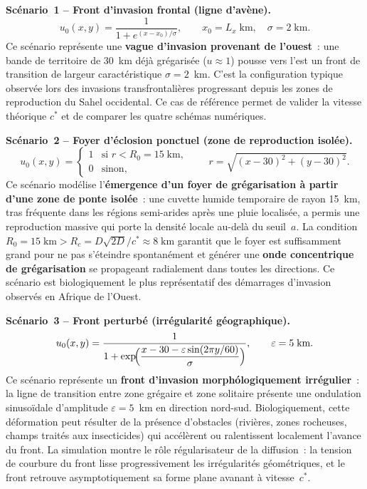 \documentclass[11pt,a4paper]{report}
\begin{document}
\medskip
\noindent\textbf{Sc\'enario~1 -- Front d'invasion frontal (ligne d'av\`ene).}
\begin{equation}
  u_0(x,y) = \frac{1}{1+e^{(x-x_0)/\sigma}},
  \qquad x_0 = L_x\;\text{km},\quad \sigma = 2\;\text{km}.
\end{equation}
Ce sc\'enario repr\'esente une \textbf{vague d'invasion provenant de l'ouest}~: une
bande de territoire de 30~km d\'ej\`a grégarisée ($u\approx 1$) pousse vers l'est
un front de transition de largeur caract\'eristique $\sigma = 2$~km. C'est la
configuration typ\-ique observ\'ee lors des invasions transfrontali\`eres progressant
depuis les zones de reproduction du Sahel occidental. Ce cas de r\'ef\'erence permet
de valider la vitesse th\'eorique $c^*$ et de comparer les quatre sch\'emas num\'eriques.

\medskip
\noindent\textbf{Sc\'enario~2 -- Foyer d'\'eclosion ponctuel (zone de reproduction isol\'ee).}
\begin{equation}
  u_0(x,y) = \begin{cases}
    1 & \text{si } r < R_0 = 15\;\text{km}, \\
    0 & \text{sinon},
  \end{cases}
  \qquad r = \sqrt{(x-30)^2+(y-30)^2}.
\end{equation}
Ce sc\'enario mod\'elise l'\textbf{\'emergence d'un foyer de gr\'egarisation
\`a partir d'une zone de ponte isol\'ee}~: une cuvette humide temporaire de
rayon 15~km, tras fr\'equente dans les r\'egions semi-arides apr\`es une pluie
localis\'ee, a permis une reproduction massive qui porte la densit\'e locale
au-del\`a du seuil~$a$. La condition $R_0 = 15\;\text{km} > R_c = D\sqrt{2D}/c^*
\approx 8\;\text{km}$ garantit que le foyer est suffisamment grand pour ne pas
s'\'eteindre spontan\'ement et g\'en\'erer une \textbf{onde concentrique de
gr\'egarisation} se propageant radialement dans toutes les directions. Ce sc\'enario
est biologiquement le plus repr\'esentatif des d\'emarrages d'invasion observ\'es
en Afrique de l'Ouest.

\medskip
\noindent\textbf{Sc\'enario~3 -- Front perturb\'e (irr\'egularit\'e g\'eographique).}
\begin{equation}
  u_0(x,y)
  = \frac{1}{1+\exp\!\Bigl(\dfrac{x - 30 - \varepsilon\sin(2\pi y/60)}{\sigma}\Bigr)},
  \qquad \varepsilon = 5\;\text{km}.
\end{equation}
Ce sc\'enario repr\'esente un \textbf{front d'invasion morph\'ologiquement irr\'egulier}~:
la ligne de transition entre zone gr\'egaire et zone solitaire pr\'esente une ondulation
sinuso\"idale d'amplitude $\varepsilon = 5$~km en direction nord-sud. Biologiquement,
cette d\'eformation peut r\'esulter de la pr\'esence d'obstacles (rivi\`eres, zones
rocheuses, champs trait\'es aux insecticides) qui acc\'el\`erent ou ralentissent
localement l'avance du front. La simulation montre le r\^ole r\'egularisateur de la
diffusion~: la tension de courbure du front lisse progressivement les irr\'egularit\'es
g\'eom\'etriques, et le front retrouve asymptotiquement sa forme plane avanant
\`a vitesse~$c^*$.
\end{document}
